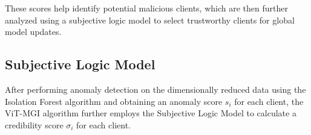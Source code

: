 \documentclass[conference]{IEEEtran}
\begin{document}
These scores help identify potential malicious clients, which are then further analyzed using a subjective logic model to select trustworthy clients for global model updates.


\subsection{Subjective Logic Model}
\label{sec:method_subjective}


After performing anomaly detection on the dimensionally reduced data using the Isolation Forest algorithm and obtaining an anomaly score $s_i$ for each client, the ViT-MGI algorithm further employs the Subjective Logic Model\cite{Subjective_Logic_Model} to calculate a credibility score $\sigma_i$ for each client.






\end{document}
